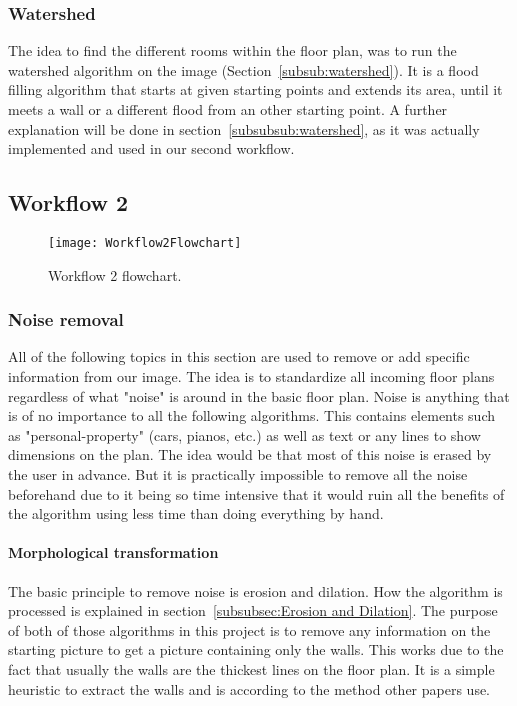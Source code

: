   
\subsubsection{Watershed}
The idea to find the different rooms within the floor plan, was to run the watershed algorithm on the image (Section~\ref{subsub:watershed}). It is a flood filling algorithm that starts at given starting points and extends its area, until it meets a wall or a different flood from an other starting point. A further explanation will be done in section~\ref{subsubsub:watershed}, as it was actually implemented and used in our second workflow.

\subsection{Workflow 2}
\label{sub:workflow2}

\begin{figure}[H]
	\centering
	\texttt{[image: Workflow2Flowchart]}
	\caption{Workflow 2 flowchart.}
	\label{fig:Workflow2Flowchart}
\end{figure}

\subsubsection{Noise removal}
All of the following topics in this section are used to remove or add specific information from our image. The idea is to standardize all incoming floor plans regardless of what "noise" is around in the basic floor plan. Noise is anything that is of no importance to all the following algorithms. This contains elements such as "personal-property" (cars, pianos, etc.) as well as text or any lines to show dimensions on the plan. The idea would be that most of this noise is erased by the user in advance. But it is practically impossible to remove all the noise beforehand due to it being so time intensive that it would ruin all the benefits of the algorithm using less time than doing everything by hand.

\paragraph{Morphological transformation}
\label{sub:MorphologicalTransformation}

The basic principle to remove noise is erosion and dilation. How the algorithm is processed is explained in section~\ref{subsubsec:Erosion and Dilation}.
The purpose of both of those algorithms in this project is to remove any information on the starting picture to get a picture containing only the walls. This works due to the fact that usually the walls are the thickest lines on the floor plan. It is a simple heuristic to extract the walls and is according to the method other papers use. 

